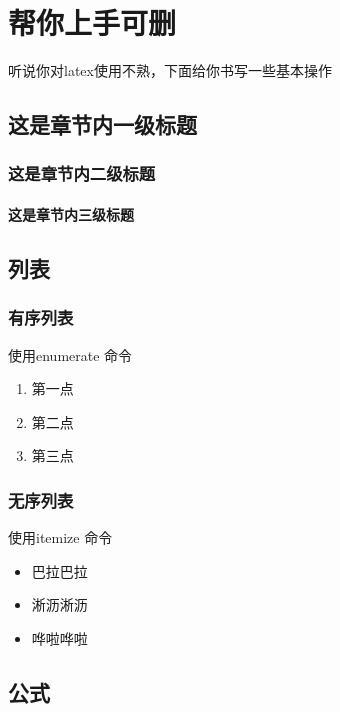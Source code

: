 \chapter{帮你上手可删}

听说你对latex使用不熟，下面给你书写一些基本操作

\section{这是章节内一级标题}

\subsection{这是章节内二级标题}

\subsubsection{这是章节内三级标题}


\section{列表}

\subsection{有序列表}

使用enumerate 命令

\begin{enumerate}
    \item 第一点
    \item 第二点
    \item 第三点
\end{enumerate}

\subsection{无序列表}

使用itemize 命令

\begin{itemize}
    \item 巴拉巴拉
    \item 淅沥淅沥
    \item 哗啦哗啦
\end{itemize}


\section{公式}

